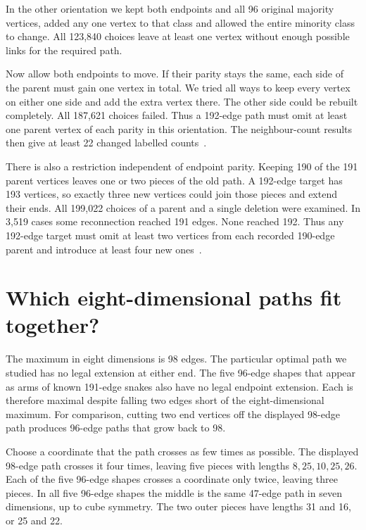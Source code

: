 \documentclass[11pt,a4paper]{article}
\begin{document}
In the other orientation we kept both endpoints and all 96 original
majority vertices, added any one vertex to that class and allowed the
entire minority class to change. All 123,840 choices leave at least
one vertex without enough possible links for the required path.

Now allow both endpoints to move. If their parity stays the same,
each side of the parent must gain one vertex in total. We tried all
ways to keep every vertex on either one side and add the extra vertex
there. The other side could be rebuilt completely. All 187,621 choices
failed. Thus a 192-edge path must omit at least one parent vertex of
each parity in this orientation. The neighbour-count results then give
at least 22 changed labelled counts~\cite{free245}.

There is also a restriction independent of endpoint parity. Keeping
190 of the 191 parent vertices leaves one or two pieces of the old
path. A 192-edge target has 193 vertices, so exactly three new
vertices could join those pieces and extend their ends. All 199,022
choices of a parent and a single deletion were examined. In 3,519
cases some reconnection reached 191 edges. None reached 192. Thus
any 192-edge target must omit at least two vertices from each recorded
190-edge parent and introduce at least four new ones~\cite{free245}.

\section{Which eight-dimensional paths fit together?}
The maximum in eight dimensions is 98 edges. The particular optimal
path we studied has no legal extension at either end. The five
96-edge shapes that appear as arms of known 191-edge snakes also have
no legal endpoint extension. Each is therefore maximal despite falling
two edges short of the eight-dimensional maximum. For comparison,
cutting two end vertices off the displayed 98-edge path produces
96-edge paths that grow back to 98.

Choose a coordinate that the path crosses as few times as possible.
The displayed 98-edge path crosses it four times, leaving five
pieces with lengths $8,25,10,25,26$. Each of the five 96-edge shapes
crosses a coordinate only twice, leaving three pieces. In all five
96-edge shapes the middle is the same 47-edge path in seven dimensions,
up to cube symmetry.
The two outer pieces have lengths 31 and 16, or 25 and 22.
\end{document}
